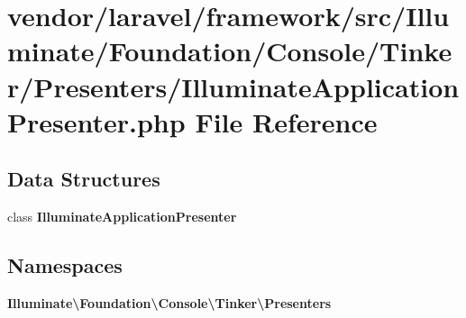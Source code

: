 \section{vendor/laravel/framework/src/\+Illuminate/\+Foundation/\+Console/\+Tinker/\+Presenters/\+Illuminate\+Application\+Presenter.php File Reference}
\label{_illuminate_application_presenter_8php}
\subsection*{Data Structures}
\begin{DoxyCompactItemize}
\item 
class {\bf Illuminate\+Application\+Presenter}
\end{DoxyCompactItemize}
\subsection*{Namespaces}
\begin{DoxyCompactItemize}
\item 
 {\bf Illuminate\textbackslash{}\+Foundation\textbackslash{}\+Console\textbackslash{}\+Tinker\textbackslash{}\+Presenters}
\end{DoxyCompactItemize}
